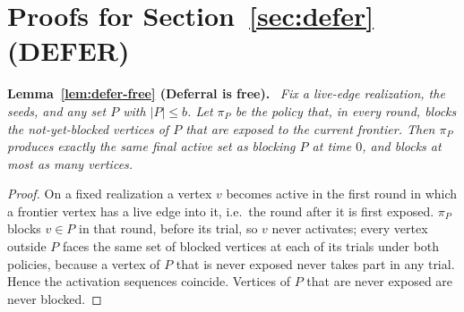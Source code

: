\documentclass[ASNA,number]{USG}
\newenvironment{repeatlemma}[1][]{\par\medskip\noindent\textbf{#1.}\ \itshape}{\par\medskip}
\begin{document}
\appendix

\section{Proofs for Section~\ref{sec:defer} (DEFER)}\label{ec:defer-proofs}

\begin{repeatlemma}[Lemma~\ref{lem:defer-free} (Deferral is free)]
Fix a live-edge realization, the seeds, and any set $P$ with $|P|\le b$. Let
$\pi_P$ be the policy that, in every round, blocks the not-yet-blocked
vertices of $P$ that are exposed to the current frontier. Then $\pi_P$
produces exactly the same final active set as blocking $P$ at time $0$, and
blocks at most as many vertices.
\end{repeatlemma}
\begin{proof}
On a fixed realization a vertex $v$ becomes active in the first round in
which a frontier vertex has a live edge into it, i.e.\ the round after it is
first exposed. $\pi_P$ blocks $v\in P$ in that round, before its trial, so
$v$ never activates; every vertex outside $P$ faces the same set of blocked
vertices at each of its trials under both policies, because a vertex of $P$
that is never exposed never takes part in any trial. Hence the activation
sequences coincide. Vertices of $P$ that are never exposed are never
blocked.
\end{proof}
\end{document}
